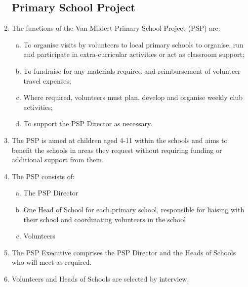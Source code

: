\documentclass[12pt]{article}
\begin{document}
\begin{enumerate}
    \subsection{Primary School Project}
    \item The functions of the Van Mildert Primary School Project (PSP) are:
    \begin{enumerate}[(a)]
        \item To organise visits by volunteers to local primary schools to organise, run and participate in extra-curricular activities or act as classroom support;
        \item To fundraise for any materials required and reimbursement of volunteer travel expenses;
        \item Where required, volunteers must plan, develop and organise weekly club activities;
        \item To support the PSP Director as necessary.
    \end{enumerate}
    \item The PSP is aimed at children aged 4-11 within the schools and aims to benefit the schools in areas they request without requiring funding or additional support from them.
    \item The PSP consists of:
    \begin{enumerate}[(a)]
        \item The PSP Director
        \item One Head of School for each primary school, responsible for liaising with their school and coordinating volunteers in the school
        \item Volunteers
    \end{enumerate}
    \item The PSP Executive comprises the PSP Director and the Heads of Schools who will meet as required.
    \item Volunteers and Heads of Schools are selected by interview.

\end{enumerate}
\end{document}
